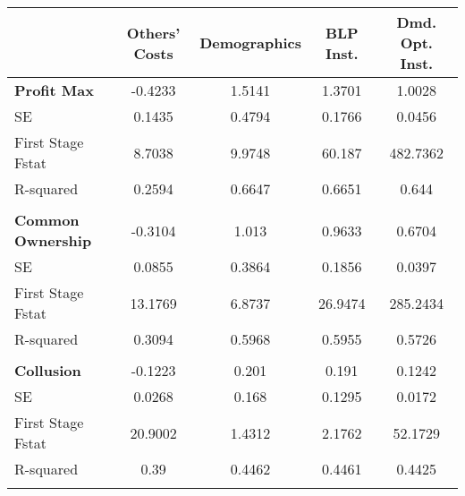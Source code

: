 \begin{tabular}{lcccc}
\toprule
                   & Others' Costs & Demographics & BLP Inst. & Dmd. Opt. Inst. \\
\midrule
         \textbf{Profit Max}&       -0.4233 &       1.5141 &    1.3701 &          1.0028 \\
                SE &        0.1435 &       0.4794 &    0.1766 &          0.0456 \\
 First Stage Fstat &        8.7038 &       9.9748 &    60.187 &        482.7362 \\
         R-squared &        0.2594 &       0.6647 &    0.6651 &           0.644 \\
                   &               &              &           &                 \\
               \textbf{Common Ownership}&       -0.3104 &        1.013 &    0.9633 &          0.6704 \\
                SE &        0.0855 &       0.3864 &    0.1856 &          0.0397 \\
 First Stage Fstat &       13.1769 &       6.8737 &   26.9474 &        285.2434 \\
         R-squared &        0.3094 &       0.5968 &    0.5955 &          0.5726 \\
                   &               &              &           &                 \\
      \textbf{Collusion} &       -0.1223 &        0.201 &     0.191 &          0.1242 \\
                SE &        0.0268 &        0.168 &    0.1295 &          0.0172 \\
 First Stage Fstat &       20.9002 &       1.4312 &    2.1762 &         52.1729 \\
         R-squared &          0.39 &       0.4462 &    0.4461 &          0.4425 \\
                   &               &              &           &                 \\
\bottomrule
\end{tabular}
